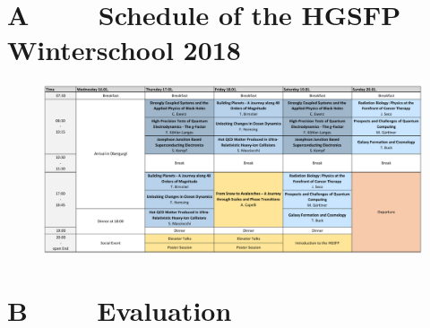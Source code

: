 \newpage
\section*{A $\qquad$ Schedule of the HGSFP Winterschool 2018}

\begin{figure}[h!]
\centering
\includegraphics[scale=0.66, angle = 90 ]{figures/Program.jpg}
\end{figure}


\section*{B $\qquad$ Evaluation}

\newpage